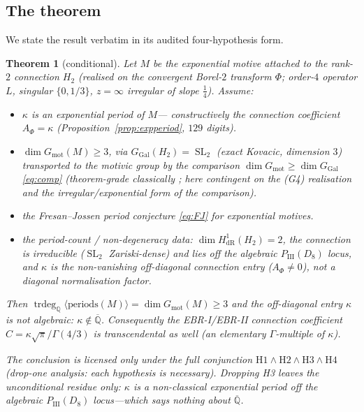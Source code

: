 \documentclass[11pt,reqno]{amsart}
\theoremstyle{plain}
\newtheorem{theorem}{Theorem}
\theoremstyle{definition}
\theoremstyle{remark}
\newcommand{\Q}{\mathbb{Q}}
\newcommand{\Qbar}{\overline{\Q}}
\newcommand{\GGal}{G_{\mathrm{Gal}}}
\newcommand{\Gmot}{G_{\mathrm{mot}}}
\newcommand{\SL}{\operatorname{SL}}
\newcommand{\trdeg}{\operatorname{trdeg}}
\newcommand{\Htwo}{H_{2}}
\newcommand{\PIII}{P_{\mathrm{III}}}
\begin{document}
\subsection{The theorem}\label{sec:thmstatement}
We state the result verbatim in its audited four-hypothesis form.

\begin{theorem}[conditional]\label{thm:main}
Let $M$ be the exponential motive attached to the rank-$2$ connection $\Htwo$
(realised on the convergent Borel-$2$ transform $\Phi$; order-$4$ operator $L$,
singular $\{0,1/3\}$, $z=\infty$ irregular of slope $\tfrac14$). Assume:
\begin{itemize}
\item[(H1, \textsc{structural})] $\kappa$ is an exponential period of $M$---%
constructively the connection coefficient $A_{\Phi}=\kappa$
(Proposition~\ref{prop:expperiod}, $129$ digits).
\item[(H2, \textsc{conjectured} motivic / \textsc{verified} differential)]
$\dim\Gmot(M)\ge3$, via $\GGal(\Htwo)=\SL_{2}$ (exact Kovacic, dimension $3$)
transported to the motivic group by the comparison
$\dim\Gmot\ge\dim\GGal$ \eqref{eq:comp} (theorem-grade classically
\cite{AndreIHES,AndrePanoramas}; here contingent on the (G4) realisation and the
irregular/exponential form of the comparison).
\item[(H3, \textsc{conjectured} external)] the Fresan--Jossen period conjecture
\eqref{eq:FJ} for exponential motives.
\item[(H4, \textsc{verified})] the period-count / non-degeneracy data:
$\dim H^{1}_{\mathrm{dR}}(\Htwo)=2$, the connection is irreducible ($\SL_{2}$
Zariski-dense) and lies off the algebraic $\PIII(D_{8})$ locus, and $\kappa$ is
the non-vanishing off-diagonal connection entry ($A_{\Phi}\neq0$), not a
diagonal normalisation factor.
\end{itemize}
Then $\trdeg_{\Q}\langle\text{periods}(M)\rangle=\dim\Gmot(M)\ge3$ and the
off-diagonal entry $\kappa$ is not algebraic: $\kappa\notin\Qbar$. Consequently
the EBR-I/EBR-II connection coefficient $C=\kappa\sqrt{\pi}/\Gamma(4/3)$ is
transcendental as well (an elementary $\Gamma$-multiple of $\kappa$).

The conclusion is licensed only under the full conjunction
$\mathrm{H1}\wedge\mathrm{H2}\wedge\mathrm{H3}\wedge\mathrm{H4}$ (drop-one
analysis: each hypothesis is necessary). Dropping H3 leaves the unconditional
residue only: $\kappa$ is a non-classical exponential period off the algebraic
$\PIII(D_{8})$ locus---which says nothing about $\Qbar$.
\end{theorem}
\end{document}
